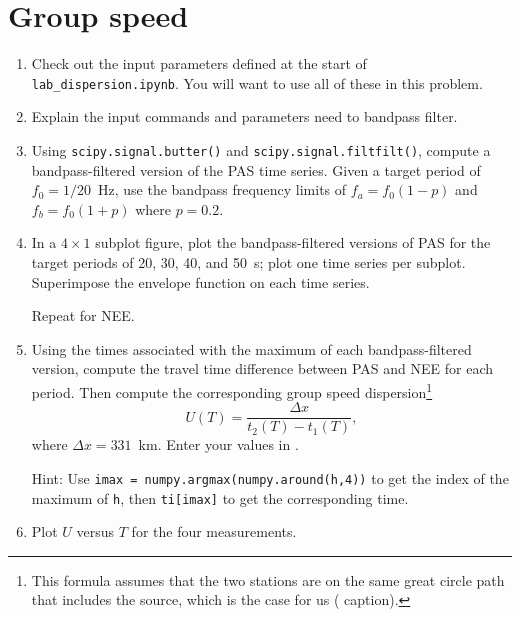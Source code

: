 \documentclass[11pt,titlepage,fleqn]{article}
\begin{document}

\section{Group speed}

\begin{enumerate}
\item Check out the input parameters defined at the start of \verb+lab_dispersion.ipynb+. You will want to use all of these in this problem.

\item Explain the input commands and parameters need to bandpass filter.


\item Using \verb+scipy.signal.butter()+ and \verb+scipy.signal.filtfilt()+, compute a bandpass-filtered version of the PAS time series. Given a target period of $f_0 = 1/20$~Hz, use the bandpass frequency limits of $f_a = f_0(1-p)$ and $f_b = f_0(1+p)$ where $p = 0.2$.

\item In a $4 \times 1$ subplot figure, plot the bandpass-filtered versions of PAS for the target periods of 20, 30, 40, and 50~s; plot one time series per subplot. Superimpose the envelope function on each time series.

Repeat for NEE.

\item Using the times associated with the maximum of each bandpass-filtered version, compute the travel time difference between PAS and NEE for each period. Then compute the corresponding group speed dispersion\footnote{This formula assumes that the two stations are on the same great circle path that includes the source, which is the case for us ( caption).}
%
\begin{equation}
U(T) = \frac{\Delta x}{t_2(T) - t_1(T)},
\label{group}
\end{equation}
%
where $\Delta x = 331$~km. Enter your values in .

Hint: Use \verb+imax = numpy.argmax(numpy.around(h,4))+ to get the index of the maximum of \verb+h+, then \verb+ti[imax]+ to get the corresponding time.

\item Plot $U$ versus $T$ for the four measurements.
\end{enumerate}
\end{document}
